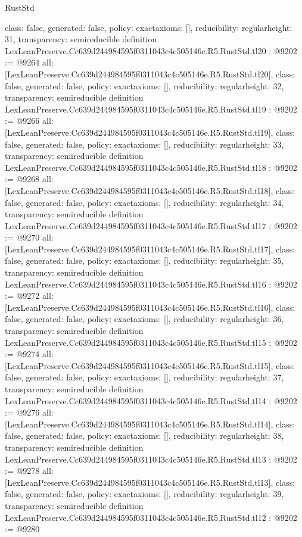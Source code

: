 \begin{lexlean}{RustStd}
\begin{coremodule}
{  class: false,
  generated: false,
  policy: exact{axioms: []},
  reducibility: regular{height: 31},
  transparency: semireducible
}
definition LexLeanPreserve.Cc639d244984595f0311043c4c505146e.R5.RustStd.tl20 : @9202 := @9264 {
  all: [LexLeanPreserve.Cc639d244984595f0311043c4c505146e.R5.RustStd.tl20],
  class: false,
  generated: false,
  policy: exact{axioms: []},
  reducibility: regular{height: 32},
  transparency: semireducible
}
definition LexLeanPreserve.Cc639d244984595f0311043c4c505146e.R5.RustStd.tl19 : @9202 := @9266 {
  all: [LexLeanPreserve.Cc639d244984595f0311043c4c505146e.R5.RustStd.tl19],
  class: false,
  generated: false,
  policy: exact{axioms: []},
  reducibility: regular{height: 33},
  transparency: semireducible
}
definition LexLeanPreserve.Cc639d244984595f0311043c4c505146e.R5.RustStd.tl18 : @9202 := @9268 {
  all: [LexLeanPreserve.Cc639d244984595f0311043c4c505146e.R5.RustStd.tl18],
  class: false,
  generated: false,
  policy: exact{axioms: []},
  reducibility: regular{height: 34},
  transparency: semireducible
}
definition LexLeanPreserve.Cc639d244984595f0311043c4c505146e.R5.RustStd.tl17 : @9202 := @9270 {
  all: [LexLeanPreserve.Cc639d244984595f0311043c4c505146e.R5.RustStd.tl17],
  class: false,
  generated: false,
  policy: exact{axioms: []},
  reducibility: regular{height: 35},
  transparency: semireducible
}
definition LexLeanPreserve.Cc639d244984595f0311043c4c505146e.R5.RustStd.tl16 : @9202 := @9272 {
  all: [LexLeanPreserve.Cc639d244984595f0311043c4c505146e.R5.RustStd.tl16],
  class: false,
  generated: false,
  policy: exact{axioms: []},
  reducibility: regular{height: 36},
  transparency: semireducible
}
definition LexLeanPreserve.Cc639d244984595f0311043c4c505146e.R5.RustStd.tl15 : @9202 := @9274 {
  all: [LexLeanPreserve.Cc639d244984595f0311043c4c505146e.R5.RustStd.tl15],
  class: false,
  generated: false,
  policy: exact{axioms: []},
  reducibility: regular{height: 37},
  transparency: semireducible
}
definition LexLeanPreserve.Cc639d244984595f0311043c4c505146e.R5.RustStd.tl14 : @9202 := @9276 {
  all: [LexLeanPreserve.Cc639d244984595f0311043c4c505146e.R5.RustStd.tl14],
  class: false,
  generated: false,
  policy: exact{axioms: []},
  reducibility: regular{height: 38},
  transparency: semireducible
}
definition LexLeanPreserve.Cc639d244984595f0311043c4c505146e.R5.RustStd.tl13 : @9202 := @9278 {
  all: [LexLeanPreserve.Cc639d244984595f0311043c4c505146e.R5.RustStd.tl13],
  class: false,
  generated: false,
  policy: exact{axioms: []},
  reducibility: regular{height: 39},
  transparency: semireducible
}
definition LexLeanPreserve.Cc639d244984595f0311043c4c505146e.R5.RustStd.tl12 : @9202 := @9280 {
}
\end{coremodule}
\end{lexlean}
